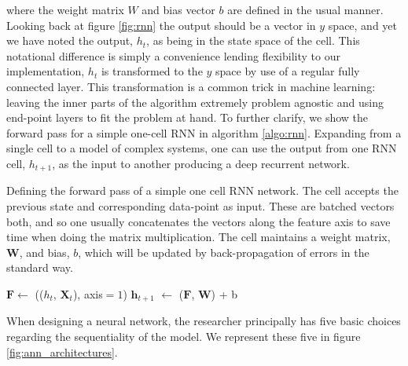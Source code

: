 \noindent where the weight matrix $W$ and bias vector $b$ are defined in the usual manner. Looking back at figure \ref{fig:rnn} the output should be a vector in $y$ space, and yet we have noted the output, $h_t$, as being in the state space of the cell. This notational difference is simply a convenience lending flexibility to our implementation, $h_t$ is transformed to the $y$ space by use of a regular fully connected layer. This transformation is a common trick in machine learning: leaving the inner parts of the algorithm extremely problem agnostic and using end-point layers to fit the problem at hand. To further clarify, we show the forward pass for a simple one-cell RNN in algorithm \ref{algo:rnn}. Expanding from a single cell to a model of complex systems, one can use the output from one RNN cell, $h_{t+1}$, as the input to another producing a deep recurrent network. 

\begin{algorithm}[H]
\SetAlgoLined
\caption{Defining the forward pass of a simple one cell RNN network. The cell accepts the previous state and corresponding data-point as input. These are batched vectors both, and so one usually concatenates the vectors along the feature axis to save time when doing the matrix multiplication. The cell maintains a weight matrix, $\boldsymbol{W}$, and bias, $b$, which will be updated by back-propagation of errors in the standard way.}\label{algo:rnn}
$\boldsymbol{F} \gets$ (($h_t$, $\boldsymbol{X}_t$), axis$=1$)\;
$\boldsymbol{h}_{t+1}$ $\gets$ ($\boldsymbol{F}$, $\boldsymbol{W}$) + b\;
\end{algorithm}

\noindent When designing a neural network, the researcher principally has five basic choices regarding the sequentiality of the model. We represent these five in figure \ref{fig:ann_architectures}.

